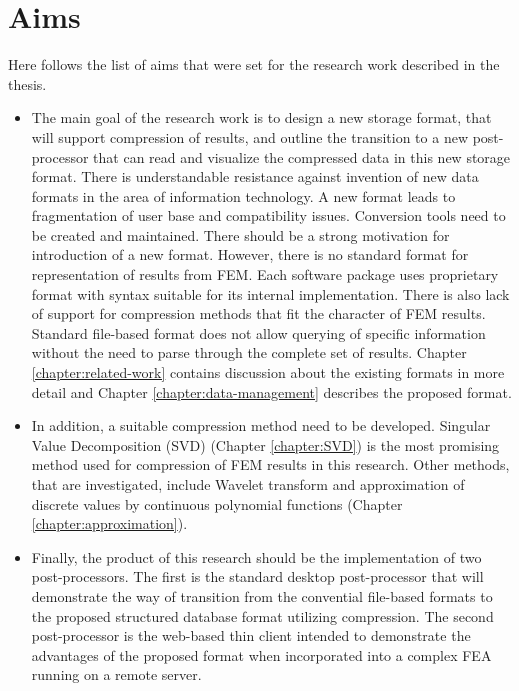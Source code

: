 \chapter{Aims}
\label{chapter:aims}

Here follows the list of aims that were set for the research work described in the thesis.

\begin{itemize}
    \item The main goal of the research work is to design a new storage format, that will support compression of results, and outline the transition to a new post-processor that can read and visualize the compressed data in this new storage format. There is understandable resistance against invention of new data formats in the area of information technology. A new format leads to fragmentation of user base and compatibility issues. Conversion tools need to be created and maintained. There should be a strong motivation for introduction of a new format. However, there is no standard format for representation of results from FEM. Each software package uses proprietary format with syntax suitable for its internal implementation. There is also lack of support for compression methods that fit the character of FEM results. Standard file-based format does not allow querying of specific information without the need to parse through the complete set of results. Chapter \ref{chapter:related-work} contains discussion about the existing formats in more detail and Chapter \ref{chapter:data-management} describes the proposed format.
    \item In addition, a suitable compression method need to be developed. Singular Value Decomposition (SVD) (Chapter \ref{chapter:SVD}) is the most promising method used for compression of FEM results in this research. Other methods, that are investigated, include Wavelet transform \cite{Li2014} and approximation of discrete values by continuous polynomial functions (Chapter \ref{chapter:approximation}).
    \item Finally, the product of this research should be the implementation of two post-processors. The first is the standard desktop post-processor that will demonstrate the way of transition from the convential file-based formats to the proposed structured database format utilizing compression. The second post-processor is the web-based thin client intended to demonstrate the advantages of the proposed format when incorporated into a complex FEA running on a remote server.
\end{itemize}

